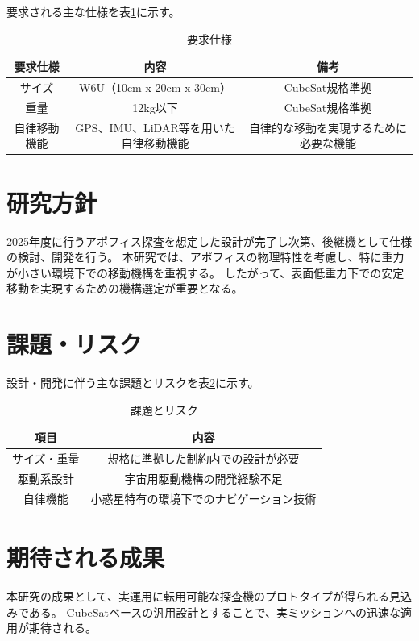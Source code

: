 \documentclass[dvipdfmx,titlepage,a4j]{jsarticle}
\begin{document}
要求される主な仕様を表\ref{tab:spec}に示す。


\begin{table}[H]
    \centering
    \caption{要求仕様}
    \begin{tabular}{c|c|c}
        \hline
        要求仕様   & 内容                       & 備考                  \\
        \hline \hline
        サイズ    & W6U（10cm x 20cm x 30cm）  & CubeSat規格準拠         \\
        \hline
        重量     & 12kg以下                   & CubeSat規格準拠         \\
        \hline
        自律移動機能 & GPS、IMU、LiDAR等を用いた自律移動機能 & 自律的な移動を実現するために必要な機能 \\
        \hline
    \end{tabular}
    \label{tab:spec}
\end{table}

\section{研究方針}
2025年度に行うアポフィス探査を想定した設計が完了し次第、後継機として仕様の検討、開発を行う。
本研究では、アポフィスの物理特性を考慮し、特に重力が小さい環境下での移動機構を重視する。
したがって、表面低重力下での安定移動を実現するための機構選定が重要となる。

\section{課題・リスク}
設計・開発に伴う主な課題とリスクを表\ref{tab:issue}に示す。

\begin{table}[H]
    \centering
    \caption{課題とリスク}
    \begin{tabular}{c|c}
        \hline
        項目     & 内容                   \\
        \hline \hline
        サイズ・重量 & 規格に準拠した制約内での設計が必要    \\
        駆動系設計  & 宇宙用駆動機構の開発経験不足       \\
        自律機能   & 小惑星特有の環境下でのナビゲーション技術 \\
        \hline
    \end{tabular}
    \label{tab:issue}
\end{table}

\section{期待される成果}
本研究の成果として、実運用に転用可能な探査機のプロトタイプが得られる見込みである。
CubeSatベースの汎用設計とすることで、実ミッションへの迅速な適用が期待される。

\newpage

\nocite{*}


\end{document}
